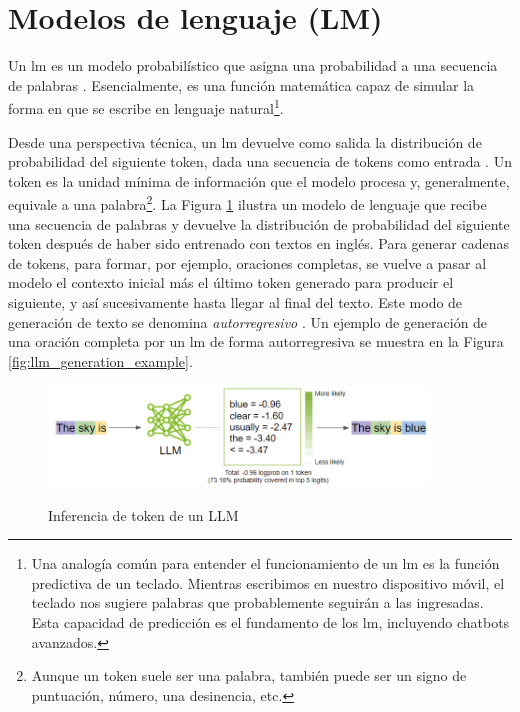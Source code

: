 \section{Modelos de lenguaje (LM)}

Un \gls{lm} es un modelo probabilístico que asigna una probabilidad a una secuencia de palabras \citep{ModelacionLenguaje2024}. Esencialmente, es una función matemática capaz de simular la forma en que se escribe en lenguaje natural\footnote{Una analogía común para entender el funcionamiento de un \gls{lm} es la función predictiva de un teclado. Mientras escribimos en nuestro dispositivo móvil, el teclado nos sugiere palabras que probablemente seguirán a las ingresadas. Esta capacidad de predicción es el fundamento de los \gls{lm}, incluyendo chatbots avanzados.}.

Desde una perspectiva técnica, un \gls{lm} devuelve como salida la distribución de probabilidad del siguiente token, dada una secuencia de tokens como entrada \citep{GenerationLLMs}. Un token es la unidad mínima de información que el modelo procesa y, generalmente, equivale a una palabra\footnote{Aunque un token suele ser una palabra, también puede ser un signo de puntuación, número, una desinencia, etc.}.  La Figura \ref{fig:llm_generation} ilustra un modelo de lenguaje que recibe una secuencia de palabras y devuelve la distribución de probabilidad del siguiente token después de haber sido entrenado con textos en inglés. Para generar cadenas de tokens, para formar, por ejemplo, oraciones completas, se vuelve a pasar al modelo el contexto inicial más el último token generado para producir el siguiente, y así sucesivamente hasta llegar al final del texto. Este modo de generación de texto se denomina \emph{autorregresivo} \citep{malachAutoRegressiveNextTokenPredictors2023}. Un ejemplo de generación de una oración completa por un \gls{lm} de forma autorregresiva se muestra en la Figura \ref{fig:llm_generation_example}.

\begin{figure}[H]
    \caption[Inferencia de token de un LLM]{Inferencia de token de un LLM}
    \centering
    \includegraphics[width=0.9\textwidth]{./figuras/LLM_predice_token.png}
    \label{fig:llm_generation}
\end{figure}

